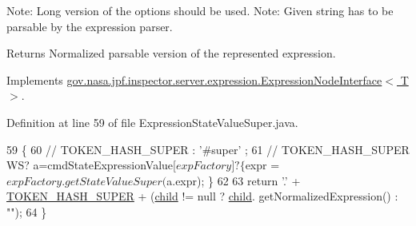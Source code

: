 Note\+: Long version of the options should be used. Note\+: Given string has to be parsable by the expression parser.

\begin{DoxyReturn}{Returns}
Normalized parsable version of the represented expression. 
\end{DoxyReturn}


Implements \hyperlink{interfacegov_1_1nasa_1_1jpf_1_1inspector_1_1server_1_1expression_1_1_expression_node_interface_ae5387d8da0126c1256a786d54b9bd7ce}{gov.\+nasa.\+jpf.\+inspector.\+server.\+expression.\+Expression\+Node\+Interface$<$ T $>$}.



Definition at line 59 of file Expression\+State\+Value\+Super.\+java.


\begin{DoxyCode}
59                                            \{
60     \textcolor{comment}{// TOKEN\_HASH\_SUPER : '#super' ;}
61     \textcolor{comment}{// TOKEN\_HASH\_SUPER WS? a=cmdStateExpressionValue[$expFactory]? \{ $expr =
       $expFactory.getStateValueSuper($a.expr); \}}
62 
63     \textcolor{keywordflow}{return} \textcolor{charliteral}{'.'} + \hyperlink{classgov_1_1nasa_1_1jpf_1_1inspector_1_1server_1_1expression_1_1expressions_1_1_expression_state_value_super_ab4ef1d41a5534563505035d19e6ed946}{TOKEN\_HASH\_SUPER} + (\hyperlink{classgov_1_1nasa_1_1jpf_1_1inspector_1_1server_1_1expression_1_1_expression_state_unary_operator_a66041b1f569a361549e28a00f7ca5f2f}{child} != null ? \hyperlink{classgov_1_1nasa_1_1jpf_1_1inspector_1_1server_1_1expression_1_1_expression_state_unary_operator_a66041b1f569a361549e28a00f7ca5f2f}{child}.
      getNormalizedExpression() : \textcolor{stringliteral}{""});
64   \}
\end{DoxyCode}
